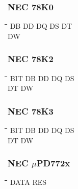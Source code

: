\subsubsection{NEC 78K0}
{\tt\begin{tabbing}
\hspace{3cm}\=\hspace{3cm}\=\hspace{3cm}\=\hspace{3cm}\=\kill
DB         \> DD          \> DQ          \> DS          \> DT \\
DW \\
\end{tabbing}}

\subsubsection{NEC 78K2}
{\tt\begin{tabbing}
\hspace{3cm}\=\hspace{3cm}\=\hspace{3cm}\=\hspace{3cm}\=\kill
BIT        \> DB         \> DD          \> DQ          \> DS  \\
DT         \> DW \\
\end{tabbing}}

\subsubsection{NEC 78K3}
{\tt\begin{tabbing}
\hspace{3cm}\=\hspace{3cm}\=\hspace{3cm}\=\hspace{3cm}\=\kill
BIT        \> DB         \> DD          \> DQ          \> DS  \\
DT         \> DW \\
\end{tabbing}}

\subsubsection{NEC $\mu$PD772x}
{\tt\begin{tabbing}
\hspace{3cm}\=\hspace{3cm}\=\hspace{3cm}\=\hspace{3cm}\=\kill
DATA       \> RES \\
\end{tabbing}}

